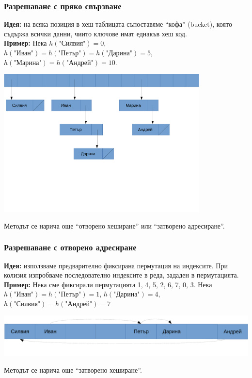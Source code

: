 \documentclass{beamer}
\begin{document}
\begin{frame}
  \frametitle{Разрешаване с пряко свързване}
  \textbf{Идея:} на всяка позиция в хеш таблицата съпоставяме ``кофа'' (bucket), която съдържа всички данни, чиито ключове имат еднакъв хеш код.\\
  \pause
  \textbf{Пример:} Нека $h(\text{"Силвия"{}}) = 0$, $h(\text{"Иван"{}}) = h(\text{"Петър"{}}) = h(\text{"Дарина"{}}) = 5$, $h(\text{"Марина"{}}) = h(\text{"Андрей"{}}) = 10$.
  \begin{center}
    \includegraphics[width=0.8\textwidth]{images/hash_chaining.pdf}
  \end{center}
  \pause
  Методът се нарича още ``отворено хеширане'' или ``затворено адресиране''.
\end{frame}

\begin{frame}
  \frametitle{Разрешаване с отворено адресиране}
  \textbf{Идея:} използваме предварително фиксирана пермутация на индексите. При колизия изпробваме последователно индексите в реда, зададен в пермутацията.\\
  \pause
  \textbf{Пример:} Нека сме фиксирали пермутацията 1, 4, 5, 2, 6, 7, 0, 3.
  Нека $h(\text{"Иван"{}}) = h(\text{"Петър"{}}) = 1$, $h(\text{"Дарина"{}}) = 4$, $h(\text{"Силвия"{}}) = h(\text{"Андрей"{}}) = 7$
  \begin{center}
    \includegraphics[width=\textwidth]{images/hash_open.pdf}
  \end{center}
  \pause
  Методът се нарича още ``затворено хеширане''.
\end{frame}
\end{document}

